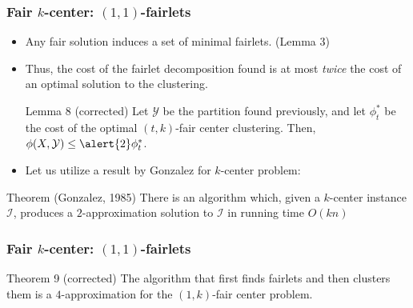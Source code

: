 \documentclass{beamer}
\begin{document}
\begin{frame}
\frametitle{Fair $k$-center: $(1, 1)$-fairlets}

\begin{itemize}
	\item Any fair solution induces a set of minimal fairlets. (Lemma 3) \pause
	
	\item Thus, the cost of the fairlet decomposition found is at most {\it twice} the cost of an optimal solution to the clustering.
	
	\begin{block}{Lemma 8 (corrected)\cite{Rosner2019}}
	Let $\mathcal{Y}$ be the partition found previously, and let $\phi_t^*$ be the cost of the optimal $(t, k)$-fair center clustering. Then, $\phi(X, \mathcal{Y}) \leq \alert{2} \phi_t^*$.

	\end{block} \pause
	
	\item Let us utilize a result by Gonzalez for $k$-center problem:
\end{itemize}

\begin{block}{Theorem (Gonzalez, 1985)}
There is an algorithm which, given a $k$-center instance $\mathcal{I}$, produces a $2$-approximation solution to $\mathcal{I}$ in running time $O(kn)$

\end{block}

\end{frame}



\begin{frame}
\frametitle{Fair $k$-center: $(1, 1)$-fairlets}

\begin{block}{Theorem 9 (corrected)}
The algorithm that first finds fairlets and then clusters them is a \alert{$4$-approximation} for the $(1, k)$-fair center problem.

\end{block}

\end{frame}

\end{document}
